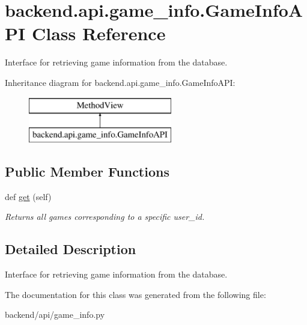 \hypertarget{classbackend_1_1api_1_1game__info_1_1_game_info_a_p_i}{}\section{backend.\+api.\+game\+\_\+info.\+Game\+Info\+A\+P\+I Class Reference}
\label{classbackend_1_1api_1_1game__info_1_1_game_info_a_p_i}


Interface for retrieving game information from the database.  


Inheritance diagram for backend.\+api.\+game\+\_\+info.\+Game\+Info\+A\+P\+I\+:\begin{figure}[H]
\begin{center}
\leavevmode
\includegraphics[height=2.000000cm]{classbackend_1_1api_1_1game__info_1_1_game_info_a_p_i}
\end{center}
\end{figure}
\subsection*{Public Member Functions}
\begin{DoxyCompactItemize}
\item 
\hypertarget{classbackend_1_1api_1_1game__info_1_1_game_info_a_p_i_aef40c5419f43cbeb1fd80b152759b872}{}def \hyperlink{classbackend_1_1api_1_1game__info_1_1_game_info_a_p_i_aef40c5419f43cbeb1fd80b152759b872}{get} (self)\label{classbackend_1_1api_1_1game__info_1_1_game_info_a_p_i_aef40c5419f43cbeb1fd80b152759b872}

\begin{DoxyCompactList}\small\item\em Returns all games corresponding to a specific user\+\_\+id. \end{DoxyCompactList}\end{DoxyCompactItemize}


\subsection{Detailed Description}
Interface for retrieving game information from the database. 

The documentation for this class was generated from the following file\+:\begin{DoxyCompactItemize}
\item 
backend/api/game\+\_\+info.\+py\end{DoxyCompactItemize}
